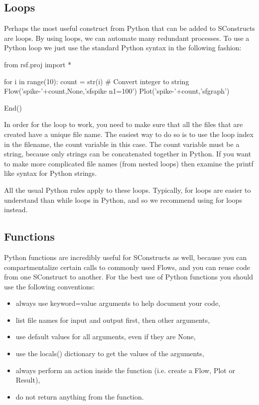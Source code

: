 \subsection{Loops}

Perhaps the most useful construct from Python that can be added to SConstructs are loops.  By using loops, we can automate many redundant processes.  To use a Python loop we just use the standard Python syntax in the following fashion:
\begin{verbatimtab}[4]
from rsf.proj import *

for i in range(10):
	count = str(i) # Convert integer to string
	Flow('spike-'+count,None,'sfspike n1=100')
	Plot('spike-'+count,'sfgraph')
	
End()
\end{verbatimtab}
In order for the loop to work, you need to make sure that all the files that are created have a unique file name.  The easiest way to do so is to use the loop index in the filename, the count variable in this case.  The count variable must be a string, because only strings can be concatenated together in Python.   If you want to make more complicated file names (from nested loops) then examine the printf like syntax for Python strings. 

All the usual Python rules apply to these loops.  Typically, for loops are easier to understand than while loops in Python, and so we recommend using for loops instead.

\subsection{Functions}

Python functions are incredibly useful for SConstructs as well, because you can compartmentalize certain calls to commonly used Flows, and you can reuse code from one SConstruct to another.  For the best use of Python functions you should use the following conventions:

\begin{itemize}
\item always use keyword=value arguments to help document your code,
\item list file names for input and output first, then other arguments,
\item use default values for all arguments, even if they are None,
\item use the locals() dictionary to get the values of the arguments,
\item always perform an action inside the function (i.e. create a Flow, Plot or Result),
\item do not return anything from the function.
\end{itemize}

